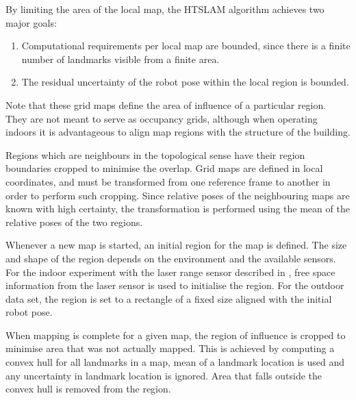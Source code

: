 By limiting the area of the local map, the HTSLAM algorithm achieves
two major goals: 
\begin{enumerate}
\item Computational requirements per local map
are bounded, since there is a finite number of landmarks visible from
a finite area.
\item The residual uncertainty of the robot pose within the local region is bounded.
\end{enumerate}

Note that these grid maps define the area of influence of a particular
region. They are not meant to serve as occupancy grids, although when
operating indoors it is advantageous to align map regions with the
structure of the building.

Regions which are neighbours in the topological sense have their region
boundaries cropped to minimise the overlap. Grid maps
are defined in local coordinates, and must be transformed
from one reference frame to another in order to perform such
cropping. Since relative poses of the neighbouring maps are known with
high certainty, the transformation is performed using the mean of the
relative poses of the two regions.


Whenever a new map is started, an initial region for the map is defined.
The size and shape of the region depends on the environment and the
available sensors. For the indoor experiment with the laser range
sensor described in , free space information from the laser sensor is used to
initialise the region. For the outdoor data set, the region is set to a
rectangle of a fixed size aligned with the initial robot pose.

When mapping is complete for a given map, the region of influence is
cropped to minimise area that was not actually
mapped. This is achieved by computing a convex hull for all landmarks in a map,
mean of a landmark location is used and any uncertainty in landmark
location is ignored. Area that falls outside the convex hull is
removed from the region.



